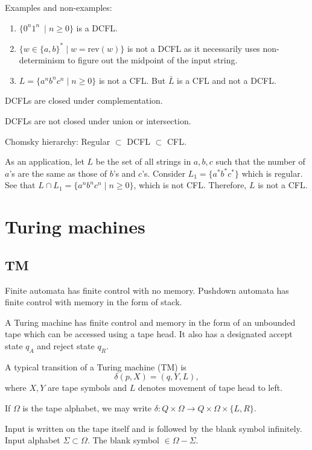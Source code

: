 \documentclass{article}
\begin{document}
Examples and non-examples: 
\begin{enumerate}
\item\label{item:44} $\{0^n1^n\ \mid n \geq 0\}$ is a DCFL. 
\item\label{item:45} $\{ w \in \{a, b\}^{*} \mid w = \text{rev}(w) \}$ is not a DCFL as it necessarily uses non-determinism to figure out the midpoint of the input string. 
\item\label{item:46} $L = \{ a^nb^nc^n \mid n \geq 0 \}$ is not a CFL. But $\bar{L}$ is a CFL and not a DCFL.
\end{enumerate}

DCFLs are closed under complementation.

DCFLs are not closed under union or intersection.

Chomsky hierarchy: Regular $\subset$ DCFL $\subset$ CFL.

As an application, let $L$ be the set of all strings in $a, b, c$ such that the number of $a$'s are the same as those of $b$'s and $c$'s. Consider $L_1 = \{a^{*}b^{*}c^{*}\}$ which is regular. See that $L \cap L_1 = \{ a^nb^nc^n \mid n \geq 0 \}$, which is not CFL. Therefore, $L$ is not a CFL.

\section{Turing machines}

\subsection{TM}

Finite automata has finite control with no memory. Pushdown automata has finite control with memory in the form of stack.

A Turing machine has finite control and memory in the form of an unbounded tape which can be accessed using a tape head. It also has a designated accept state $q_A$ and reject state $q_R$.

A typical transition of a Turing machine (TM) is 
\begin{displaymath}
  \delta(p, X) = (q, Y, L),
\end{displaymath}
where $X, Y$ are tape symbols and $L$ denotes movement of tape head to left.

If $\Omega$ is the tape alphabet, we may write $\delta : Q \times \Omega \to Q \times \Omega \times \{ L, R \}$.

Input is written on the tape itself and is followed by the blank symbol infinitely. Input alphabet $\Sigma \subset \Omega$. The blank symbol $\in \Omega - \Sigma$.
\end{document}
